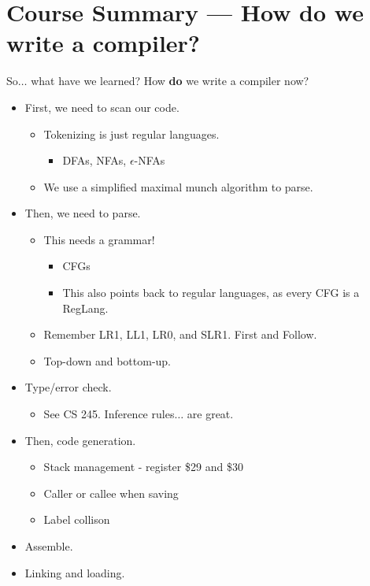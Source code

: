 \documentclass[12pt]{article}
\begin{document}
\section{Course Summary --- How do we write a compiler?}
So$\dots$ what have we learned?  How \textbf{do} we write a compiler now?
\begin{itemize}
    \item First, we need to scan our code.
        \begin{itemize}
            \item Tokenizing is just regular languages.
                \begin{itemize}
                    \item DFAs, NFAs, $\epsilon$-NFAs
                \end{itemize}
            \item We use a simplified maximal munch algorithm to parse.
        \end{itemize}
    \item Then, we need to parse.  
        \begin{itemize}
            \item This needs a grammar!
                \begin{itemize}
                    \item CFGs
                    \item This also points back to regular languages, as every CFG is a RegLang.
                \end{itemize}
            \item Remember LR1, LL1, LR0, and SLR1.  First and Follow.
            \item Top-down and bottom-up.
        \end{itemize}
    \item Type/error check.
        \begin{itemize}
            \item See CS 245.  Inference rules$\dots$ are great.
        \end{itemize}
    \item Then, code generation.
        \begin{itemize}
            \item Stack management - register \$29 and \$30
            \item Caller or callee when saving
            \item Label collison
        \end{itemize}
    \item Assemble.
    \item Linking and loading.
\end{itemize}
\end{document}
